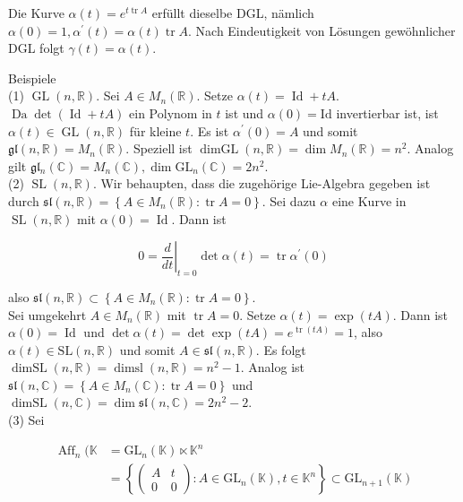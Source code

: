 \documentclass[10pt, letterpaper]{article}
\begin{document}
Die Kurve $\alpha(t)=e^{t \operatorname{tr} A}$ erfüllt dieselbe DGL, nämlich $\alpha(0)= 1, \alpha^{\prime}(t)=\alpha(t) \operatorname{tr} A$. Nach Eindeutigkeit von Lösungen gewöhnlicher DGL folgt $\gamma(t)=\alpha(t)$.

Beispiele\\
(1) $\operatorname{GL}(n, \mathbb{R})$. Sei $A \in M_{n}(\mathbb{R})$. Setze $\alpha(t)=\operatorname{Id}+t A$. $\operatorname{Da} \operatorname{det}(\operatorname{Id}+t A)$ ein Polynom in $t$ ist und $\alpha(0)=\mathrm{Id}$ invertierbar ist, ist $\alpha(t) \in \operatorname{GL}(n, \mathbb{R})$ für kleine $t$. Es ist $\alpha^{\prime}(0)=A$ und somit $\mathfrak{g} \mathfrak{l}(n, \mathbb{R})= M_{n}(\mathbb{R})$. Speziell ist $\operatorname{dimGL}(n, \mathbb{R})=\operatorname{dim} M_{n}(\mathbb{R})=n^{2}$. Analog gilt $\mathfrak{g} \mathfrak{l}_{n}(\mathbb{C})=M_{n}(\mathbb{C}), \operatorname{dim} \mathrm{GL}_{n}(\mathbb{C})=2 n^{2}$.\\
(2) $\operatorname{SL}(n, \mathbb{R})$. Wir behaupten, dass die zugehörige Lie-Algebra gegeben ist durch $\mathfrak{s} \mathfrak{l}(n, \mathbb{R})=\left\{A \in M_{n}(\mathbb{R}): \operatorname{tr} A=0\right\}$. Sei dazu $\alpha$ eine Kurve in $\operatorname{SL}(n, \mathbb{R})$ mit $\alpha(0)=\operatorname{Id}$. Dann ist

$$
0=\left.\frac{d}{d t}\right|_{t=0} \operatorname{det} \alpha(t)=\operatorname{tr} \alpha^{\prime}(0)
$$

also $\mathfrak{s l}(n, \mathbb{R}) \subset\left\{A \in M_{n}(\mathbb{R}): \operatorname{tr} A=0\right\}$.\\
Sei umgekehrt $A \in M_{n}(\mathbb{R})$ mit $\operatorname{tr} A=0$. Setze $\alpha(t)= \exp (t A)$. Dann ist $\alpha(0)=\operatorname{Id}$ und $\operatorname{det} \alpha(t)=\operatorname{det} \exp (t A)= e^{\operatorname{tr}(t A)}=1$, also $\alpha(t) \in \mathrm{SL}(n, \mathbb{R})$ und somit $A \in \mathfrak{s l}(n, \mathbb{R})$. Es folgt $\operatorname{dimSL}(n, \mathbb{R})=\operatorname{dimsl}(n, \mathbb{R})=n^{2}-1$. Analog ist $\mathfrak{s} \mathfrak{l}(n, \mathbb{C})=\left\{A \in M_{n}(\mathbb{C}): \operatorname{tr} A=0\right\}$ und $\operatorname{dimSL}(n, \mathbb{C})= \operatorname{dim} \mathfrak{s l}(n, \mathbb{C})=2 n^{2}-2$.\\
(3) Sei

$$
\begin{aligned}
\operatorname{Aff}_{n}(\mathbb{K} & =\mathrm{GL}_{n}(\mathbb{K}) \ltimes \mathbb{K}^{n} \\
& =\left\{\left(\begin{array}{cc}
A & t \\
0 & 0
\end{array}\right): A \in \mathrm{GL}_{n}(\mathbb{K}), t \in \mathbb{K}^{n}\right\} \subset \mathrm{GL}_{n+1}(\mathbb{K})
\end{aligned}
$$
\end{document}
